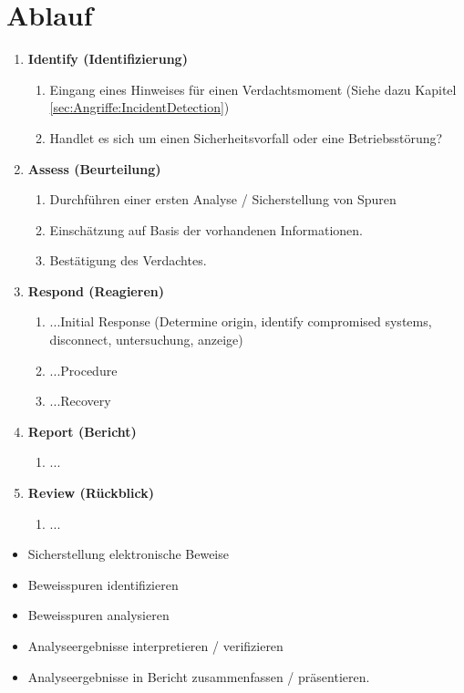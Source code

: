 \section{Ablauf}
\begin{enumerate}
\item \textbf{Identify (Identifizierung)}\\
\begin{enumerate}
\item Eingang eines Hinweises für einen Verdachtsmoment (Siehe dazu Kapitel \ref{sec:Angriffe:IncidentDetection})
\item Handlet es sich um einen Sicherheitsvorfall oder eine Betriebsstörung?
\end{enumerate}
\item \textbf{Assess (Beurteilung)}\\
\begin{enumerate}
\item Durchführen einer ersten Analyse / Sicherstellung von Spuren
\item Einschätzung auf Basis der vorhandenen Informationen.
\item Bestätigung des Verdachtes.
\end{enumerate}
\item \textbf{Respond (Reagieren)}\\
\begin{enumerate}
\item ...Initial Response (Determine origin, identify compromised systems, disconnect, untersuchung, anzeige)
\item ...Procedure
\item ...Recovery
\end{enumerate}
\item \textbf{Report (Bericht)}\\
\begin{enumerate}
\item ...
\end{enumerate}
\item \textbf{Review (Rückblick)}\\
\begin{enumerate}
\item ...
\end{enumerate}
\end{enumerate}




\begin{itemize}
  \item Sicherstellung elektronische Beweise
  \item Beweisspuren identifizieren
  \item Beweisspuren analysieren
  \item Analyseergebnisse interpretieren / verifizieren
  \item Analyseergebnisse in Bericht zusammenfassen / präsentieren.
\end{itemize}
